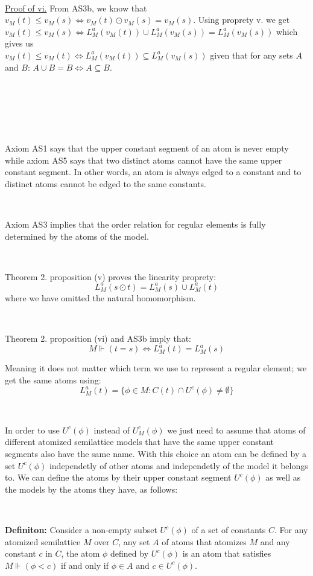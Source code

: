 \documentclass[a4paper, 11pt]{article}
\begin{document}
\

\noindent
\underline{Proof of vi.} From AS3b, we know that $v_M(t) \leq v_M(s) \Leftrightarrow v_M(t) \odot v_M(s) = v_M(s)$. Using proprety v. we get $v_M(t) \leq v_M(s) \Leftrightarrow L_M^a(v_M(t)) \cup L_M^a(v_M(s)) = L_M^a(v_M(s))$ which gives us \\
$v_M(t) \leq v_M(t) \Leftrightarrow L_M^a(v_M(t)) \subseteq L_M^a(v_M(s))$ given that for any sets $A$ and $B$: $A \cup B = B \Leftrightarrow A \subseteq B$.

\

\

\

Axiom AS1 says that the upper constant segment of an atom is never empty while axiom AS5 says that two distinct atoms cannot have the same upper constant segment. In other words, an atom is always edged to a constant and to distinct atoms cannot be edged to the same constants.

\

Axiom AS3 implies that the order relation for regular elements is fully determined by the atoms of the model. 

\

Theorem 2. proposition (v) proves the linearity proprety:
$$ L_M^a(s \odot t) = L_M^a(s) \cup L_M^a(t)$$
where we have omitted the natural homomorphism.

\

Theorem 2. proposition (vi) and AS3b imply that:
$$M \Vdash (t = s) \Leftrightarrow L_M^a(t) = L_M^a(s)$$

Meaning it does not matter which term we use to represent a regular element; we get the same atoms using:
$$L_M^a(t) =\{\phi \in M : C(t) \cap U^c(\phi) \neq \emptyset\}$$

\

In order to use $U^c(\phi)$ instead of $U^c_M(\phi)$ we just need to assume that atoms of different atomized semilattice models that have the same upper constant segments also have the same name. With this choice an atom can be defined by a set $U^c(\phi)$ independetly of other atoms and independetly of the model it belongs to. We can define the atoms by their upper constant segment $U^c(\phi)$ as well as the models by the atoms they have, as follows:

\

\begin{tcolorbox} 
	\textbf{Definiton:} Consider a non-empty subset $U^c(\phi)$ of a set of constants $C$. For any atomized semilattice $M$ over $C$, any set $A$ of atoms that atomizes $M$ and any constant $c$ in $C$, the atom $\phi$ defined by $U^c(\phi)$ is an atom that satisfies $M \Vdash (\phi < c)$ if and only if $\phi \in A$ and $c \in U^c(\phi)$.
\end{tcolorbox}
\end{document}
